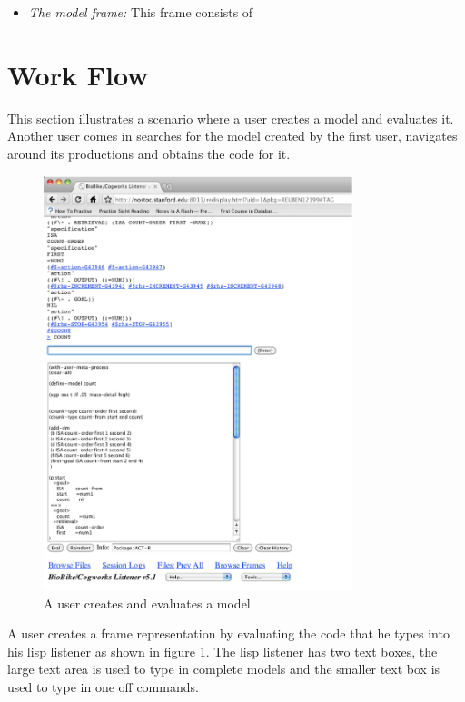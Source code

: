 \begin{itemize}
\item \emph{The model frame:} This frame consists of 
\end{itemize}



\section{Work Flow}

This section illustrates a scenario where a user creates a model and
evaluates it. Another user comes in searches for the model created by
the first user, navigates around its productions and obtains the code for
it. 

\begin{figure}[htp]
  \centering
  \includegraphics[width=90mm]{UserCreatesModel}
  \caption{A user creates and evaluates a model}
  \label{UserCreatesModel}
\end{figure}

A user creates a frame representation by evaluating the code that he
types into his lisp listener as shown in figure
\ref{UserCreatesModel}. The lisp listener has two text boxes, the
large text area is used to type in complete models and the smaller
text box is used to type in one off commands.

